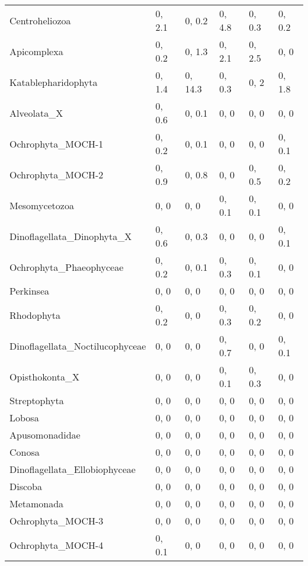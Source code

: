 \begin{table}[ht]
\begin{tabular}{llllll}
  Centroheliozoa & 0, 2.1 & 0, 0.2 & 0, 4.8 & 0, 0.3 & 0, 0.2 \\ 
  Apicomplexa & 0, 0.2 & 0, 1.3 & 0, 2.1 & 0, 2.5 & 0, 0 \\ 
  Katablepharidophyta & 0, 1.4 & 0, 14.3 & 0, 0.3 & 0, 2 & 0, 1.8 \\ 
  Alveolata\_X & 0, 0.6 & 0, 0.1 & 0, 0 & 0, 0 & 0, 0 \\ 
  Ochrophyta\_MOCH-1 & 0, 0.2 & 0, 0.1 & 0, 0 & 0, 0 & 0, 0.1 \\ 
  Ochrophyta\_MOCH-2 & 0, 0.9 & 0, 0.8 & 0, 0 & 0, 0.5 & 0, 0.2 \\ 
  Mesomycetozoa & 0, 0 & 0, 0 & 0, 0.1 & 0, 0.1 & 0, 0 \\ 
  Dinoflagellata\_Dinophyta\_X & 0, 0.6 & 0, 0.3 & 0, 0 & 0, 0 & 0, 0.1 \\ 
  Ochrophyta\_Phaeophyceae & 0, 0.2 & 0, 0.1 & 0, 0.3 & 0, 0.1 & 0, 0 \\ 
  Perkinsea & 0, 0 & 0, 0 & 0, 0 & 0, 0 & 0, 0 \\ 
  Rhodophyta & 0, 0.2 & 0, 0 & 0, 0.3 & 0, 0.2 & 0, 0 \\ 
  Dinoflagellata\_Noctilucophyceae & 0, 0 & 0, 0 & 0, 0.7 & 0, 0 & 0, 0.1 \\ 
  Opisthokonta\_X & 0, 0 & 0, 0 & 0, 0.1 & 0, 0.3 & 0, 0 \\ 
  Streptophyta & 0, 0 & 0, 0 & 0, 0 & 0, 0 & 0, 0 \\ 
  Lobosa & 0, 0 & 0, 0 & 0, 0 & 0, 0 & 0, 0 \\ 
  Apusomonadidae & 0, 0 & 0, 0 & 0, 0 & 0, 0 & 0, 0 \\ 
  Conosa & 0, 0 & 0, 0 & 0, 0 & 0, 0 & 0, 0 \\ 
  Dinoflagellata\_Ellobiophyceae & 0, 0 & 0, 0 & 0, 0 & 0, 0 & 0, 0 \\ 
  Discoba & 0, 0 & 0, 0 & 0, 0 & 0, 0 & 0, 0 \\ 
  Metamonada & 0, 0 & 0, 0 & 0, 0 & 0, 0 & 0, 0 \\ 
  Ochrophyta\_MOCH-3 & 0, 0 & 0, 0 & 0, 0 & 0, 0 & 0, 0 \\ 
  Ochrophyta\_MOCH-4 & 0, 0.1 & 0, 0 & 0, 0 & 0, 0 & 0, 0 \\ 
   \hline
\end{tabular}
\end{table}
